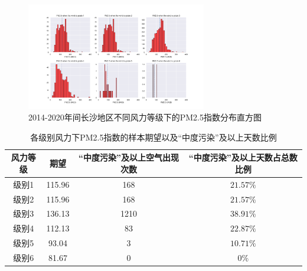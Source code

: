 \documentclass[UTF8,a4paper,10pt]{article}
\begin{document}
\begin{figure}[H] %
\centering %
\includegraphics[width=0.7\textwidth]{fig//pm25-wind.png} %
\caption{2014-2020年间长沙地区不同风力等级下的PM2.5指数分布直方图} %
\label{Fig.main5} %
\end{figure}

\begin{table}[]
    \caption{各级别风力下PM2.5指数的样本期望以及“中度污染”及以上天数比例}
    \vspace{20pt}
    \centering
    \begin{tabular}{cccc}
        \toprule  %
        风力等级& 期望& “中度污染”及以上空气出现次数& “中度污染”及以上天数占总数比例\\
        \midrule  %
        级别1& 115.96& 168& $21.57\%$\\
        级别2& 115.96& 168& $21.57\%$\\
        级别3& 136.13& 1210& $38.91\%$\\
        级别4& 112.13& 83& $22.87\%$\\
        级别5& 93.04& 3& $10.71\%$\\
        级别6& 81.67& 0& $0\%$\\
        \bottomrule %
    \end{tabular}
    \label{table4}
\end{table}



\end{document}
